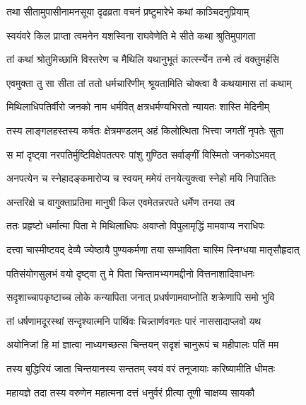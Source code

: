 \twolineshloka
{तथा सीतामुपासीनामनसूया दृढव्रता}
{वचनं प्रष्टुमारेभे कथां काञ्चिदनुप्रियाम्} %

\twolineshloka
{स्वयंवरे किल प्राप्ता त्वमनेन यशस्विना}
{राघवेणेति मे सीते कथा श्रुतिमुपागता} %

\twolineshloka
{तां कथां श्रोतुमिच्छामि विस्तरेण च मैथिलि}
{यथानुभूतं कार्त्स्न्येन तन्मे त्वं वक्तुमर्हसि} %

\twolineshloka
{एवमुक्ता तु सा सीता तां ततो धर्मचारिणीम्}
{श्रूयतामिति चोक्त्वा वै कथयामास तां कथाम्} %

\twolineshloka
{मिथिलाधिपतिर्वीरो जनको नाम धर्मवित्}
{क्षत्रधर्मण्यभिरतो न्यायतः शास्ति मेदिनीम्} %

\twolineshloka
{तस्य लाङ्गलहस्तस्य कर्षतः क्षेत्रमण्डलम्}
{अहं किलोत्थिता भित्त्वा जगतीं नृपतेः सुता} %

\twolineshloka
{स मां दृष्ट्वा नरपतिर्मुष्टिविक्षेपतत्परः}
{पांशु गुण्ठित सर्वाङ्गीं विस्मितो जनकोऽभवत्} %

\twolineshloka
{अनपत्येन च स्नेहादङ्कमारोप्य च स्वयम्}
{ममेयं तनयेत्युक्त्वा स्नेहो मयि निपातितः} %

\twolineshloka
{अन्तरिक्षे च वागुक्ताप्रतिमा मानुषी किल}
{एवमेतन्नरपते धर्मेण तनया तव} %

\twolineshloka
{ततः प्रहृष्टो धर्मात्मा पिता मे मिथिलाधिपः}
{अवाप्तो विपुलामृद्धिं मामवाप्य नराधिपः} %

\twolineshloka
{दत्त्वा चास्मीष्टवद् देव्यै ज्येष्ठायै पुण्यकर्मणा}
{तया सम्भाविता चास्मि स्निग्धया मातृसौहृदात्} %

\twolineshloka
{पतिसंयोगसुलभं वयो दृष्ट्वा तु मे पिता}
{चिन्तामभ्यगमद्दीनो वित्तनाशादिवाधनः} %

\twolineshloka
{सदृशाच्चापकृष्टाच्च लोके कन्यापिता जनात्}
{प्रधर्षणामवाप्नोति शक्रेणापि समो भुवि} %

\twolineshloka
{तां धर्षणामदूरस्थां सन्दृश्यात्मनि पार्थिवः}
{चिन्न्तार्णवगतः पारं नाससादाप्लवो यथ} %

\twolineshloka
{अयोनिजां हि मां ज्ञात्वा नाध्यगच्छत्स चिन्तयन्}
{सदृशं चानुरूपं च महीपालः पतिं मम} %

\twolineshloka
{तस्य बुद्धिरियं जाता चिन्तयानस्य सन्ततम्}
{स्वयं वरं तनूजायाः करिष्यामीति धीमतः} %

\twolineshloka
{महायज्ञे तदा तस्य वरुणेन महात्मना}
{दत्तं धनुर्वरं प्रीत्या तूणी चाक्षय्य सायकौ} %

